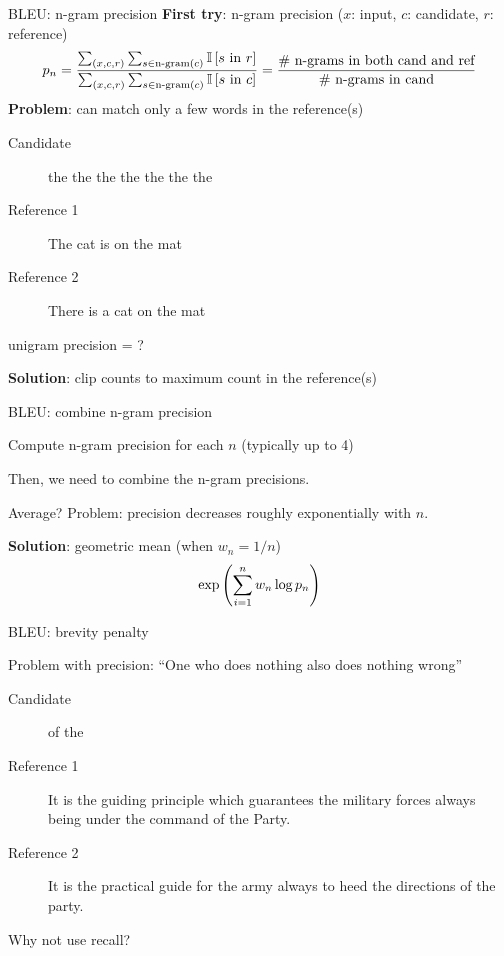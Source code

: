 \documentclass[usenames,dvipsnames,notes,11pt,aspectratio=169,hyperref={colorlinks=true, linkcolor=blue}]{beamer}
\newcommand{\pdfnote}[1]{}
\begin{document}
\begin{frame}
    {BLEU: n-gram precision}
    \textbf{First try}: n-gram precision ($x$: input, $c$: candidate, $r$: reference)
    $$
    p_n = \frac{
        \sum_{(x,c,r)} \sum_{s\in\text{n-gram}(c)} \mathbb{I}\left[ s \text{ in } r \right]
    }
    {
\sum_{(x,c,r)} \sum_{s\in\text{n-gram}(c)} \mathbb{I}\left[ s \text{ in } c \right]
    } = \frac{
        \text{\# n-grams in both cand and ref}
    }{
        \text{\# n-grams in cand}
    }
    $$
    \pause
    \textbf{Problem}: can match only a few words in the reference(s)\\
    \begin{description}
        \item[Candidate] the the the the the the the
        \item[Reference 1] The cat is on the mat
        \item[Reference 2] There is a cat on the mat
    \end{description}
    unigram precision = ?

    \textbf{Solution}: clip counts to maximum count in the reference(s)
\end{frame}

\begin{frame}
    {BLEU: combine n-gram precision}

    Compute n-gram precision for each $n$ (typically up to 4)

    Then, we need to combine the n-gram precisions.

    Average? Problem: precision decreases roughly exponentially with $n$.

    \pause
    \textbf{Solution}: geometric mean (when $w_n=1/n$)
    $$
    \exp\left( \sum_{i=1}^n w_n \log p_n \right)
    $$
\end{frame}

\begin{frame}
    {BLEU: brevity penalty}

    Problem with precision: ``One who does nothing also does nothing wrong''

    \begin{description}
        \item[Candidate] of the 
        \item[Reference 1] It is the guiding principle which guarantees the military forces always being under the command of the Party. 
        \item[Reference 2] It is the practical guide for the army always to heed the directions of the party.
    \end{description}

    Why not use recall? %
    \pdfnote{
       BLEU does not use recall because the notion of recall is unclear when simultaneously matching against multiple reference translations (rather than a single reference).  
    }
\end{frame}
\end{document}
